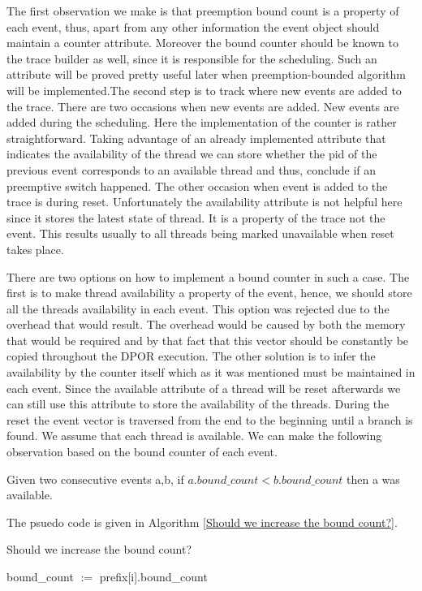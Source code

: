 The first observation we make is that preemption bound count is a property of each event, thus, apart from any other information the event object should
maintain a counter attribute. Moreover the bound counter should be known to the trace builder as well, since it is responsible for the scheduling.
Such an attribute will be proved pretty useful later when preemption-bounded algorithm will be implemented.The second step is to track where new events are added to the trace. There are two occasions when new events
are added. New events are added during the scheduling. Here the implementation of the counter is rather straightforward. 
Taking advantage of an already implemented attribute that indicates the availability of the thread we can store whether the pid of the previous event
corresponds to an available thread and thus, conclude if an preemptive switch happened.
The other occasion when event is added to the trace is during reset. Unfortunately the availability attribute is not helpful here since it stores
the latest state of thread. It is a property of the trace not the event. This results usually to all threads being marked unavailable when reset takes place.

There are two options on how to implement a bound counter in such a case. The first is to make thread availability a property of the event, hence, we should store
all the threads availability in each event. This option was rejected due to the overhead that would result. The overhead would be caused by both the
memory that would be required and by that fact that this vector should be constantly be copied throughout the DPOR execution. 
The other solution is to infer the availability by the counter itself which as it was mentioned must be maintained in each event. Since the available attribute of
a thread will be reset afterwards we can still use this attribute to store the availability of the threads. 
During the reset the event vector is traversed from the end to the beginning until a branch is found. We assume that each thread is available.
We can make the following observation based on the bound counter of each event.

Given two consecutive events a,b, if $a.bound\_count < b.bound\_count$ then a was available.

The psuedo code is given in Algorithm \ref{Should we increase the bound count?}.

\begin{algorithm}
    \caption{Should we increase the bound count?}
    \label{Should we increase the bound count?}
    bound\_count $:=$ prefix[i].bound\_count \;

\end{algorithm}


